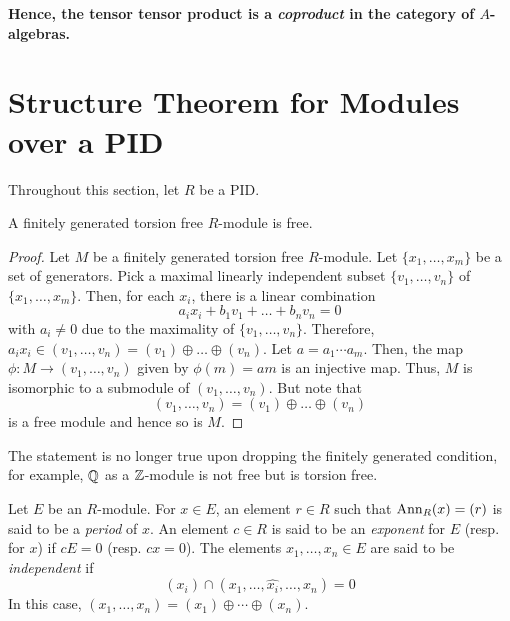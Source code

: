 \textbf{Hence, the tensor tensor product is a \emph{coproduct} in the category of $A$-algebras.}


\section{Structure Theorem for Modules over a PID}
Throughout this section, let $R$ be a PID.

\begin{lemma}
    A finitely generated torsion free $R$-module is free.
\end{lemma}
\begin{proof}
    Let $M$ be a finitely generated torsion free $R$-module. Let $\{x_1,\dots,x_m\}$ be a set of generators. Pick a maximal linearly independent subset $\{v_1,\dots,v_n\}$ of $\{x_1,\dots, x_m\}$. Then, for each $x_i$, there is a linear combination 
    \begin{equation*}
        a_ix_i + b_1v_1 + \dots + b_nv_n = 0
    \end{equation*}
    with $a_i\ne 0$ due to the maximality of $\{v_1,\dots,v_n\}$. Therefore, $a_ix_i\in (v_1,\dots,v_n) = (v_1)\oplus\dots\oplus(v_n)$. Let $a = a_1\cdots a_m$. Then, the map $\phi: M\to (v_1,\dots, v_n)$ given by $\phi(m) = am$ is an injective map. Thus, $M$ is isomorphic to a submodule of $(v_1,\dots,v_n)$. But note that 
    \begin{equation*}
        (v_1,\dots,v_n) = (v_1)\oplus\dots\oplus(v_n)
    \end{equation*}
    is a free module and hence so is $M$.
\end{proof}

The statement is no longer true upon dropping the finitely generated condition, for example, $\mathbb{Q}$ as a $\mathbb{Z}$-module is not free but is torsion free.

\begin{definition}
    Let $E$ be an $R$-module. For $x\in E$, an element $r\in R$ such that $\operatorname{Ann}_R(x) = (r)$ is said to be a \textit{period} of $x$. An element $c\in R$ is said to be an \textit{exponent} for $E$ (resp. for $x$) if $cE = 0$ (resp. $cx = 0$). The elements $x_1,\ldots,x_n\in E$ are said to be \textit{independent} if 
    \begin{equation*}
        (x_i)\cap(x_1,\ldots,\widehat{x_i},\ldots,x_n) = 0
    \end{equation*}
    In this case, $(x_1,\ldots,x_n) = (x_1)\oplus\cdots\oplus(x_n)$.
\end{definition}

